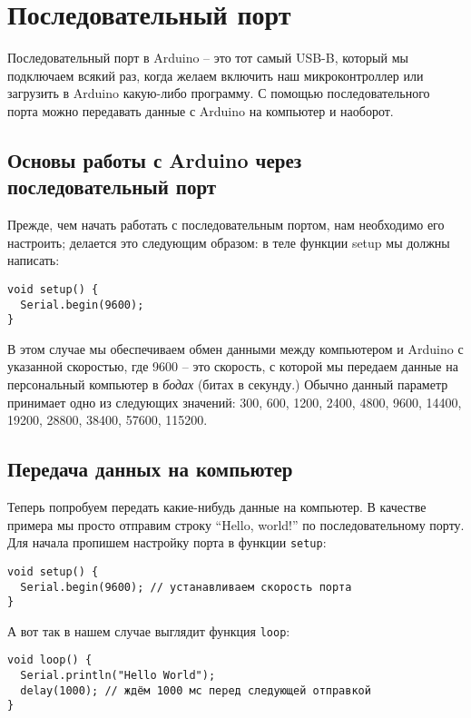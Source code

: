 \documentclass[../sparc.tex]{subfiles}
\begin{document}
\section{Последовательный порт}
\label{section:serial-port}

Последовательный порт в Arduino -- это тот самый USB-B, который мы подключаем
всякий раз, когда желаем включить наш микроконтроллер или загрузить в Arduino
какую-либо программу.  С помощью последовательного порта можно передавать данные
с Arduino на компьютер и наоборот.

\subsection{Основы работы с Arduino через последовательный порт}

Прежде, чем начать работать с последовательным портом, нам необходимо его
настроить; делается это следующим образом: в теле функции setup мы должны
написать:

\begin{verbatim}
void setup() {
  Serial.begin(9600);
}
\end{verbatim}

В этом случае мы обеспечиваем обмен данными между компьютером и Arduino с
указанной скоростью, где 9600 -- это скорость, с которой мы передаем данные на
персональный компьютер в \emph{бодах} (битах в секунду.) Обычно данный параметр
принимает одно из следующих значений: 300, 600, 1200, 2400, 4800, 9600, 14400,
19200, 28800, 38400, 57600, 115200.

\subsection{Передача данных на компьютер}

Теперь попробуем передать какие-нибудь данные на компьютер. В качестве примера
мы просто отправим строку ``Hello, world!'' по последовательному порту. Для
начала пропишем настройку порта в функции \texttt{setup}:

\begin{verbatim}
void setup() {
  Serial.begin(9600); // устанавливаем скорость порта
}
\end{verbatim}

А вот так в нашем случае выглядит функция \texttt{loop}:

\begin{verbatim}
void loop() {
  Serial.println("Hello World");
  delay(1000); // ждём 1000 мс перед следующей отправкой
}
\end{verbatim}
\end{document}
